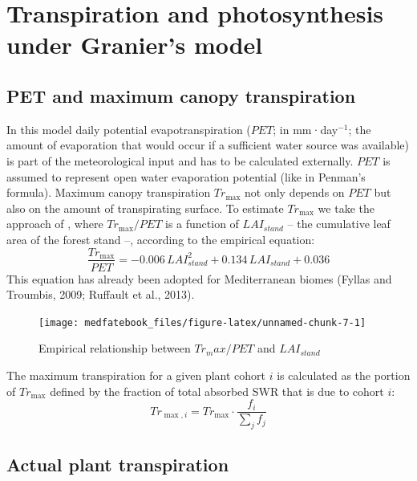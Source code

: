 \documentclass[]{book}
\begin{document}
\hypertarget{transpirationgranier}{%
\chapter{Transpiration and photosynthesis under Granier's model}\label{transpirationgranier}}

\hypertarget{pet-and-maximum-canopy-transpiration}{%
\section{PET and maximum canopy transpiration}\label{pet-and-maximum-canopy-transpiration}}

In this model daily potential evapotranspiration (\(PET\); in mm·day\(^{-1}\); the amount of evaporation that would occur if a sufficient water source was available) is part of the meteorological input and has to be calculated externally. \(PET\) is assumed to represent open water evaporation potential (like in Penman's formula). Maximum canopy transpiration \(Tr_{\max}\) not only depends on \(PET\) but also on the amount of transpirating surface. To estimate \(Tr_{\max}\) we take the approach of \citet{Granier1999}, where \(Tr_{\max}/PET\) is a function of \(LAI_{stand}\) -- the cumulative leaf area of the forest stand --, according to the empirical equation:
\begin{equation}
\frac{Tr_{\max}}{PET}= -0.006\,LAI_{stand}^2+0.134\,LAI_{stand}+0.036
\end{equation}
This equation has already been adopted for Mediterranean biomes (Fyllas and
Troumbis, 2009; Ruffault et al., 2013).

\begin{figure}

{\centering \texttt{[image: medfatebook\_files/figure-latex/unnamed-chunk-7-1]} 

}

\caption{Empirical relationship between $Tr_max/PET$ and $LAI_{stand}$}\label{fig:unnamed-chunk-7}
\end{figure}

The maximum transpiration for a given plant cohort \(i\) is calculated as the
portion of \(Tr_{\max}\) defined by the fraction of total absorbed SWR that is due
to cohort \(i\):
\begin{equation}
Tr_{\max, i} = Tr_{\max} \cdot \frac{f_i}{\sum_{j}{f_j}}
\end{equation}

\hypertarget{actual-plant-transpiration}{%
\section{Actual plant transpiration}\label{actual-plant-transpiration}}
\end{document}

